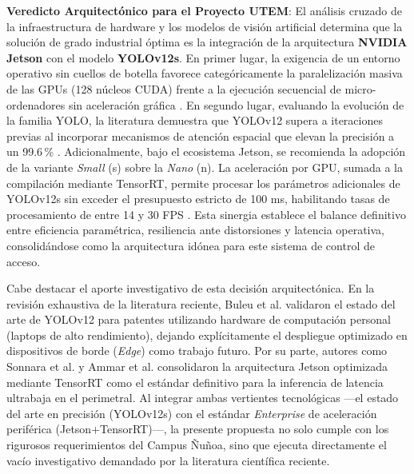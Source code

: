 \textbf{Veredicto Arquitectónico para el Proyecto UTEM}: 
El análisis cruzado de la infraestructura de hardware y los modelos de visión artificial determina que la solución de grado industrial óptima es la integración de la arquitectura \textbf{NVIDIA Jetson} con el modelo \textbf{YOLOv12s}. 
En primer lugar, la exigencia de un entorno operativo sin cuellos de botella favorece categóricamente la paralelización masiva de las GPUs (128 núcleos CUDA) frente a la ejecución secuencial de micro-ordenadores sin aceleración gráfica \parencite{ammarMultiStageDeepLearningBasedVehicle2023}. En segundo lugar, evaluando la evolución de la familia YOLO, la literatura demuestra que YOLOv12 supera a iteraciones previas al incorporar mecanismos de atención espacial que elevan la precisión a un 99.6\,\% \parencite{buleuDeepLearningBasedSystem2025a}. 
Adicionalmente, bajo el ecosistema Jetson, se recomienda la adopción de la variante \textit{Small} (s) sobre la \textit{Nano} (n). La aceleración por GPU, sumada a la compilación mediante TensorRT, permite procesar los parámetros adicionales de YOLOv12s sin exceder el presupuesto estricto de 100 ms, habilitando tasas de procesamiento de entre 14 y 30 FPS \parencite{sonnaraEfficientRealtimeLicense2025, meesadAdvancedDeepLearning2025a}. Esta sinergia establece el balance definitivo entre eficiencia paramétrica, resiliencia ante distorsiones y latencia operativa, consolidándose como la arquitectura idónea para este sistema de control de acceso.

Cabe destacar el aporte investigativo de esta decisión arquitectónica. En la revisión exhaustiva de la literatura reciente, Buleu et al. \parencite{buleuDeepLearningBasedSystem2025a} validaron el estado del arte de YOLOv12 para patentes utilizando hardware de computación personal (laptops de alto rendimiento), dejando explícitamente el despliegue optimizado en dispositivos de borde (\textit{Edge}) como trabajo futuro. Por su parte, autores como Sonnara et al. \parencite{sonnaraEfficientRealtimeLicense2025} y Ammar et al. \parencite{ammarMultiStageDeepLearningBasedVehicle2023} consolidaron la arquitectura Jetson optimizada mediante TensorRT como el estándar definitivo para la inferencia de latencia ultrabaja en el perimetral. Al integrar ambas vertientes tecnológicas ---el estado del arte en precisión (YOLOv12s) con el estándar \textit{Enterprise} de aceleración periférica (Jetson+TensorRT)---, la presente propuesta no solo cumple con los rigurosos requerimientos del Campus Ñuñoa, sino que ejecuta directamente el vacío investigativo demandado por la literatura científica reciente.

